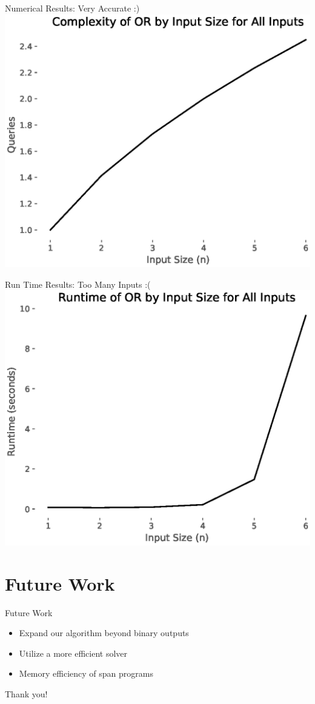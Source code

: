 \documentclass[12pt]{beamer}
\begin{document}
\begin{frame}{Numerical Results: Very Accurate :)}
\centering
\includegraphics[scale=.5]{or_all_complexity.eps}
\end{frame}

\begin{frame}{Run Time Results: Too Many Inputs :(}
\centering
\includegraphics[scale=.5]{or_all_runtime.eps}
\end{frame}

\section{Future Work}
\begin{frame}{Future Work}
\begin{itemize}
    \item Expand our algorithm beyond binary outputs
    \item Utilize a more efficient solver
    \item Memory efficiency of span programs
\end{itemize}
\end{frame}

\begin{frame}{Thank you!}


\end{frame}
\end{document}
